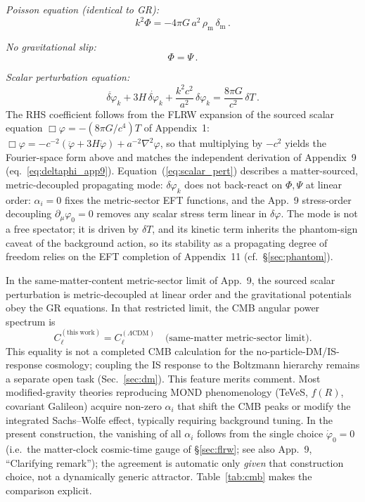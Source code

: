 \documentclass[aps,prd,onecolumn,superscriptaddress,nofootinbib,showpacs,12pt]{revtex4-2}
\begin{document}
\medskip\noindent
\textit{Poisson equation (identical to GR):}
\begin{equation}\label{eq:poisson}
  k^{2}\Phi = -4\pi G\,a^{2}\,\rho_{\mathrm{m}}\,
  \delta_{\mathrm{m}}\,.
\end{equation}

\noindent
\textit{No gravitational slip:}
\begin{equation}\label{eq:slip}
  \Phi = \Psi\,.
\end{equation}

\noindent
\textit{Scalar perturbation equation:}
\begin{equation}\label{eq:scalar_pert}
  \ddot{\delta\varphi}_{k} + 3H\,\dot{\delta\varphi}_{k}
  + \frac{k^{2}c^{2}}{a^{2}}\,\delta\varphi_{k}
  = \frac{8\pi G}{c^{2}}\,\delta T\,.
\end{equation}
The RHS coefficient follows from the FLRW expansion of the
sourced scalar equation $\Box\varphi = -(8\pi G/c^{4})T$ of
Appendix~1: $\Box\varphi = -c^{-2}(\ddot\varphi+3H\dot\varphi)
+a^{-2}\nabla^{2}\varphi$, so that multiplying by $-c^{2}$
yields the Fourier-space form above and matches the
independent derivation of Appendix~9 (eq.~\ref{eq:deltaphi_app9}).
Equation~(\ref{eq:scalar_pert}) describes a matter-sourced,
metric-decoupled propagating mode: $\delta\varphi_{k}$ does
not back-react on $\Phi,\Psi$ at linear order: $\alpha_i = 0$
fixes the metric-sector EFT functions, and the App.~9
stress-order decoupling
$\partial_\mu\varphi_0 = 0$ removes any scalar stress term
linear in $\delta\varphi$.  The mode is not a free spectator;
it is
driven by $\delta T$, and its kinetic term inherits the
phantom-sign caveat of the background action, so its
stability as a propagating degree of freedom relies on the
EFT completion of Appendix~11 (cf.~\S\ref{sec:phantom}).

In the same-matter-content metric-sector limit of
App.~9, the sourced scalar perturbation is
metric-decoupled at linear order and the gravitational
potentials obey the GR equations.  In that restricted
limit, the CMB angular power spectrum is
\begin{equation}\label{eq:Cl}
  C_{\ell}^{(\mathrm{this\;work})}
  = C_{\ell}^{(\Lambda\mathrm{CDM})}
  \quad\text{(same-matter metric-sector limit).}
\end{equation}
This equality is not a completed CMB calculation for the
no-particle-DM/IS-response cosmology; coupling the IS
response to the Boltzmann hierarchy remains a separate
open task (Sec.~\ref{sec:dm}).
This feature merits comment.  Most modified-gravity
theories reproducing MOND phenomenology (TeVeS, $f(R)$,
covariant Galileon) acquire non-zero $\alpha_{i}$ that
shift the CMB peaks or modify the integrated Sachs--Wolfe
effect, typically requiring background tuning.  In the
present construction, the vanishing of all $\alpha_{i}$
follows from the single choice $\dot{\varphi}_{0}=0$
(i.e.\ the matter-clock cosmic-time gauge of
\S\ref{sec:flrw}; see also App.~9, ``Clarifying remark'');
the agreement is automatic only \emph{given} that
construction choice, not a dynamically generic attractor.
Table~\ref{tab:cmb} makes the comparison explicit.
\end{document}
